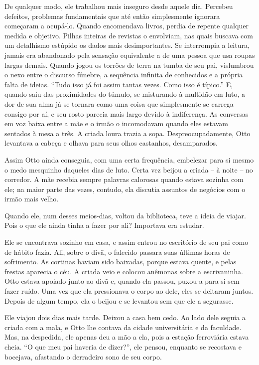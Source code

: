 De qualquer modo, ele trabalhou mais inseguro desde aquele dia. Percebeu
defeitos, problemas fundamentais que até então simplesmente ignorara
começaram a ocupá-lo. Quando encomendava livros, perdia de repente
qualquer medida e objetivo. Pilhas inteiras de revistas o envolviam, nas
quais buscava com um detalhismo estúpido os dados mais desimportantes.
Se interrompia a leitura, jamais era abandonado pela sensação
equivalente a de uma pessoa que usa roupas largas demais. Quando jogou
os torrões de terra na tumba de seu pai, vislumbrou o nexo entre o
discurso fúnebre, a sequência infinita de conhecidos e a própria falta
de ideias. ``Tudo isso já foi assim tantas vezes. Como isso é típico.''
E, quando saiu das proximidades do túmulo, se misturando à multidão em
luto, a dor de sua alma já se tornara como uma coisa que simplesmente se
carrega consigo por aí, e seu rosto parecia mais largo devido à
indiferença. As conversas em voz baixa entre a mãe e o irmão o
incomodavam quando eles estavam sentados à mesa a três. A criada loura
trazia a sopa. Despreocupadamente, Otto levantava a cabeça e olhava para
seus olhos castanhos, desamparados.

Assim Otto ainda conseguia, com uma certa frequência, embelezar para si
mesmo o medo mesquinho daqueles dias de luto. Certa vez beijou a criada
-- à noite -- no corredor. A mãe recebia sempre palavras calorosas
quando estava sozinha com ele; na maior parte das vezes, contudo, ela
discutia assuntos de negócios com o irmão mais velho.

Quando ele, num desses meios-dias, voltou da biblioteca, teve a ideia de
viajar. Pois o que ele ainda tinha a fazer por ali? Importava era
estudar.

Ele se encontrava sozinho em casa, e assim entrou no escritório de seu
pai como de hábito fazia. Ali, sobre o divã, o falecido passara suas
últimas horas de sofrimento. As cortinas haviam sido baixadas, porque
estava quente, e pelas frestas aparecia o céu. A criada veio e colocou
anêmonas sobre a escrivaninha. Otto estava apoiado junto ao divã e,
quando ela passou, puxou-a para si sem fazer ruído. Uma vez que ela
pressionava o corpo ao dele, eles se deitaram juntos. Depois de algum
tempo, ela o beijou e se levantou sem que ele a segurasse.

Ele viajou dois dias mais tarde. Deixou a casa bem cedo. Ao lado dele
seguia a criada com a mala, e Otto lhe contava da cidade universitária e
da faculdade. Mas, na despedida, ele apenas deu a mão a ela, pois a
estação ferroviária estava cheia. ``O que meu pai haveria de dizer?'',
ele pensou, enquanto se recostava e bocejava, afastando o derradeiro
sono de seu corpo.

